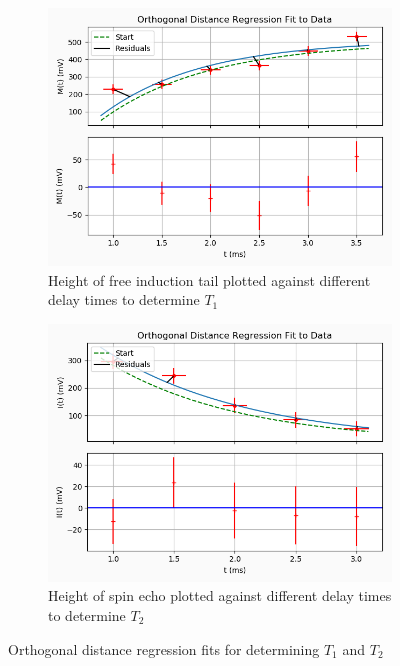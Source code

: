 \documentclass[a4paper, 12pt]{article}  %
\begin{document}
\begin{figure}[!tbp]    %
  \begin{subfigure}[b]{0.5\textwidth}
    \includegraphics[width=\textwidth]{T1.png}
    \caption{Height of free induction tail plotted against different delay times to determine $T_1$}
    \label{fig:f1}
  \end{subfigure}
  \hfill
  \begin{subfigure}[b]{0.5\textwidth}
    \includegraphics[width=\textwidth]{T2.png}
    \caption{Height of spin echo plotted against different delay times to determine $T_2$}
    \label{fig:f2}
  \end{subfigure}
  \caption{Orthogonal distance regression fits for determining $T_1$ and $T_2$}
\label{ODR fits}
\end{figure}
 
\end{document}
